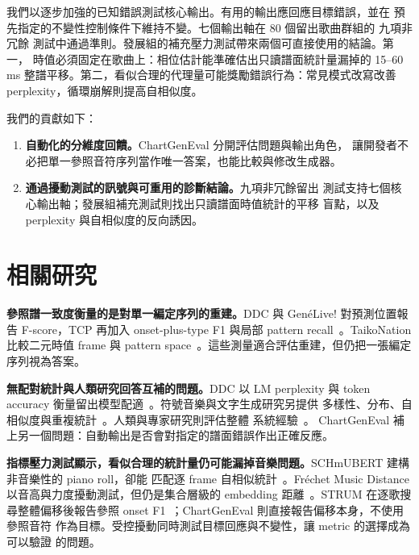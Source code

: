 \documentclass[10pt,twocolumn]{article}
\begin{document}
我們以逐步加強的已知錯誤測試核心輸出。有用的輸出應回應目標錯誤，並在
預先指定的不變性控制條件下維持不變。七個輸出軸在 80 個留出歌曲群組的
九項非冗餘
測試中通過準則。發展組的補充壓力測試帶來兩個可直接使用的結論。第一，
時值必須固定在歌曲上：相位估計能準確估出只讀譜面統計量漏掉的 15--60\,ms
整譜平移。第二，看似合理的代理量可能獎勵錯誤行為：常見模式改寫改善
perplexity，循環崩解則提高自相似度。

我們的貢獻如下：
\begin{enumerate}
\item \textbf{自動化的分維度回饋。}ChartGenEval 分開評估問題與輸出角色，
  讓開發者不必把單一參照音符序列當作唯一答案，也能比較與修改生成器。
\item \textbf{通過擾動測試的訊號與可重用的診斷結論。}九項非冗餘留出
  測試支持七個核心輸出軸；發展組補充測試則找出只讀譜面時值統計的平移
  盲點，以及 perplexity 與自相似度的反向誘因。
\end{enumerate}

\section{相關研究}\label{sec:related}

\textbf{參照譜一致度衡量的是對單一編定序列的重建。}DDC 與 Gen\'eLive!
對預測位置報告 F-score，TCP
再加入 onset-plus-type F1 與局部 pattern recall~\cite{donahue2017ddc,
takada2023genelive,hanzen2025tcp}。TaikoNation 比較二元時值 frame 與 pattern
space~\cite{halina2021taikonation}。這些測量適合評估重建，但仍把一張編定
序列視為答案。

\textbf{無配對統計與人類研究回答互補的問題。}DDC 以 LM perplexity 與
token accuracy
衡量留出模型配適~\cite{donahue2017ddc}。符號音樂與文字生成研究另提供
多樣性、分布、自相似度與重複統計~\cite{li2016diversity,zhu2018texygen,
yang2020evaluation,dong2020muspy,wu2020jazz}。人類與專家研究則評估整體
系統經驗~\cite{gover2022mute,takada2023genelive,wang2024mania}。
ChartGenEval 補上另一個問題：自動輸出是否會對指定的譜面錯誤作出正確反應。

\textbf{指標壓力測試顯示，看似合理的統計量仍可能漏掉音樂問題。}SCHmUBERT
建構非音樂性的 piano roll，卻能
匹配逐 frame 自相似統計~\cite{plasser2023schmubert}。Fr\'echet Music
Distance 以音高與力度擾動測試，但仍是集合層級的 embedding
距離~\cite{retkowski2025fmd}。STRUM 在逐歌搜尋整體偏移後報告參照 onset
F1~\cite{opria2026strum}；ChartGenEval 則直接報告偏移本身，不使用參照音符
作為目標。受控擾動同時測試目標回應與不變性，讓 metric 的選擇成為可以驗證
的問題。
\end{document}
